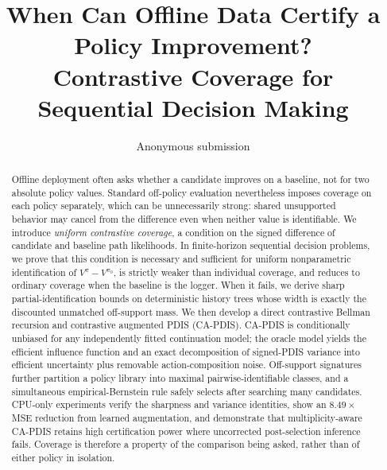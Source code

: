 \documentclass[letterpaper]{article}
\title{When Can Offline Data Certify a Policy Improvement?\\
Contrastive Coverage for Sequential Decision Making}
\author{Anonymous submission}
\newif\ifofficial
\theoremstyle{definition}
\theoremstyle{remark}
\begin{document}
\maketitle

\begin{abstract}
Offline deployment often asks whether a candidate improves on a baseline, not for two absolute policy values. Standard off-policy evaluation nevertheless imposes coverage on each policy separately, which can be unnecessarily strong: shared unsupported behavior may cancel from the difference even when neither value is identifiable. We introduce \emph{uniform contrastive coverage}, a condition on the signed difference of candidate and baseline path likelihoods. In finite-horizon sequential decision problems, we prove that this condition is necessary and sufficient for uniform nonparametric identification of $V^\pi-V^{\pi_0}$, is strictly weaker than individual coverage, and reduces to ordinary coverage when the baseline is the logger. When it fails, we derive sharp partial-identification bounds on deterministic history trees whose width is exactly the discounted unmatched off-support mass. We then develop a direct contrastive Bellman recursion and contrastive augmented PDIS (CA-PDIS). CA-PDIS is conditionally unbiased for any independently fitted continuation model; the oracle model yields the efficient influence function and an exact decomposition of signed-PDIS variance into efficient uncertainty plus removable action-composition noise. Off-support signatures further partition a policy library into maximal pairwise-identifiable classes, and a simultaneous empirical-Bernstein rule safely selects after searching many candidates. CPU-only experiments verify the sharpness and variance identities, show an $8.49\times$ MSE reduction from learned augmentation, and demonstrate that multiplicity-aware CA-PDIS retains high certification power where uncorrected post-selection inference fails. Coverage is therefore a property of the comparison being asked, rather than of either policy in isolation.
\end{abstract}








\ifofficial\FloatBarrier\fi
\label{lasttechnicalpage}
\ifofficial
  
\else
  
  
\fi

\label{lastpagebeforechecklist}
\providecommand{\isChecklistMainFile}{}

\end{document}
